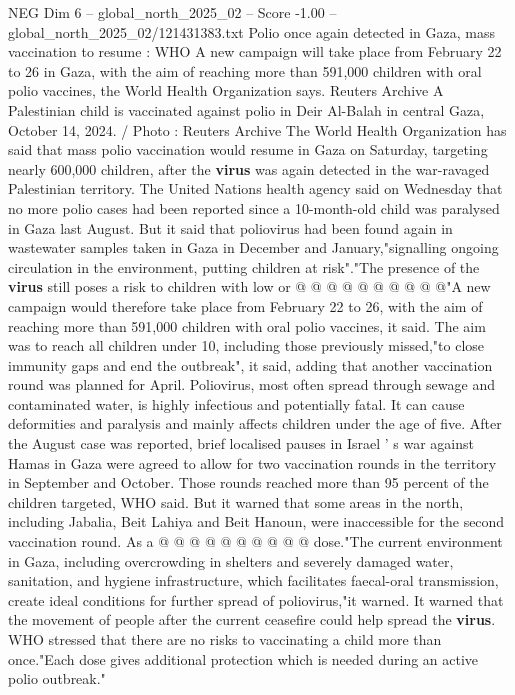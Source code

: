 \begin{textsample}{NEG Dim 6 – global\_north\_2025\_02 – Score -1.00 – global\_north\_2025\_02/121431383.txt}  \label{ex:f6_neg_114}
Polio once again detected in Gaza, mass vaccination to resume : WHO A new campaign will take place from February 22 to 26 in Gaza, with the aim of reaching more than 591,000 children with oral polio vaccines, the World Health Organization says.
Reuters Archive A Palestinian child is vaccinated against polio in Deir Al-Balah in central Gaza, October 14, 2024. / Photo : Reuters Archive The World Health Organization has said that mass polio vaccination would resume in Gaza on Saturday, targeting nearly 600,000 children, after the \textbf{virus} was again detected in the war-ravaged Palestinian territory.
The United Nations health agency said on Wednesday that no more polio cases had been reported since a 10-month-old child was paralysed in Gaza last August.
But it said that poliovirus had been found again in wastewater samples taken in Gaza in December and January,"signalling ongoing circulation in the environment, putting children at risk"."The presence of the \textbf{virus} still poses a risk to children with low or @ @ @ @ @ @ @ @ @ @"A new campaign would therefore take place from February 22 to 26, with the aim of reaching more than 591,000 children with oral polio vaccines, it said.
The aim was to reach all children under 10, including those previously missed,"to close immunity gaps and end the outbreak", it said, adding that another vaccination round was planned for April.
Poliovirus, most often spread through sewage and contaminated water, is highly infectious and potentially fatal.
It can cause deformities and paralysis and mainly affects children under the age of five.
After the August case was reported, brief localised pauses in Israel ' s war against Hamas in Gaza were agreed to allow for two vaccination rounds in the territory in September and October.
Those rounds reached more than 95 percent of the children targeted, WHO said.
But it warned that some areas in the north, including Jabalia, Beit Lahiya and Beit Hanoun, were inaccessible for the second vaccination round.
As a @ @ @ @ @ @ @ @ @ @ dose."The current environment in Gaza, including overcrowding in shelters and severely damaged water, sanitation, and hygiene infrastructure, which facilitates faecal-oral transmission, create ideal conditions for further spread of poliovirus,"it warned.
It warned that the movement of people after the current ceasefire could help spread the \textbf{virus}.
WHO stressed that there are no risks to vaccinating a child more than once."Each dose gives additional protection which is needed during an active polio outbreak."

\end{textsample}
